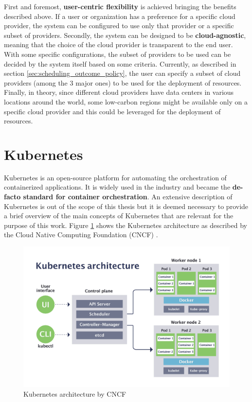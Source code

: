 First and foremost, \textbf{user-centric flexibility} is achieved bringing the benefits described above.
If a user or organization has a preference for a specific cloud provider, the system can be configured to use only that provider or a specific subset of providers.
Secondly, the system can be designed to be \textbf{cloud-agnostic}, meaning that the choice of the cloud provider is transparent to the end user. 
With some specific configurations, the subset of providers to be used can be decided by the system itself based on some criteria.
Currently, as described in section \ref{sec:scheduling_outcome_policy}, the user can specify a subset of cloud providers (among the 3 major ones) to be used for the deployment of resources.
Finally, in theory, since different cloud providers have data centers in various locations around the world, some low-carbon regions might be available only on a specific cloud provider and this could be leveraged for the deployment of resources.

\section{Kubernetes}

Kubernetes is an open-source platform for automating the orchestration of containerized applications.
It is widely used in the industry and became the \textbf{de-facto standard for container orchestration}.
An extensive description of Kubernetes is out of the scope of this thesis but it is deemed necessary to provide a brief overview of the main concepts of Kubernetes that are relevant for the purpose of this work.
Figure \ref{fig:kubernetes_architecture} shows the Kubernetes architecture as described by the Cloud Native Computing Foundation (CNCF) \cite{kubernetes_cnfc}.

\begin{figure}[htb]
    \centering
    \includegraphics[width=1\linewidth]{images/kubernetes-architecture-diagram.png}
    \caption{Kubernetes architecture by CNCF \cite{kubernetes_cnfc}}
    \label{fig:kubernetes_architecture}
\end{figure}

